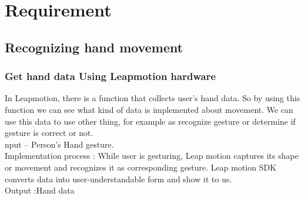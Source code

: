 \documentclass[10pt,journal,compsoc]{IEEEtran}
\begin{document}
\section{Requirement}
\label{sec:Requirement}
\fi




% 
% 
% 
% 

\subsection{Recognizing hand movement\\}


\subsubsection{Get hand data Using Leapmotion hardware}

 In Leapmotion, there is a function that collects user’s hand data. So by using this function we can see what kind of data is implemented about movement. We can use this data to use other thing, for example as recognize gesture or determine if gesture is correct or not.
\\nput – Person's Hand gesture.
\\Implementation process : While user is gesturing, Leap motion captures its shape or movement and recognizes it as corresponding gesture. Leap motion SDK converts data into user-understandable form and show it to us.
\\Output :Hand data
\end{document}
